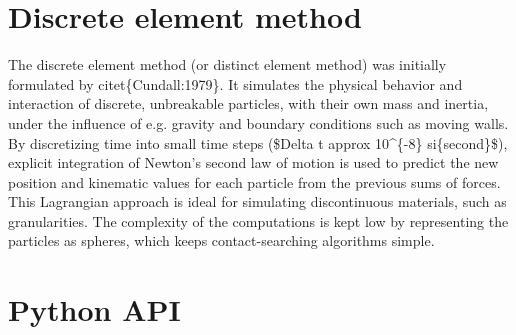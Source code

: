 \documentclass[letterpaper,10pt,english]{sphinxmanual}
\begin{document}
\chapter{Discrete element method}
\label{dem::doc}\label{dem:discrete-element-method}
The discrete element method (or distinct element method) was initially formulated by citet\{Cundall:1979\}. It simulates the physical behavior and interaction of discrete, unbreakable particles, with their own mass and inertia, under the influence of e.g. gravity and boundary conditions such as moving walls. By discretizing time into small time steps (\$Delta t approx 10\textasciicircum{}\{-8\} si\{second\}\$), explicit integration of Newton's second law of motion is used to predict the new position and kinematic values for each particle from the previous sums of forces. This Lagrangian approach is ideal for simulating discontinuous materials, such as granularities. The complexity of the computations is kept low by representing the particles as spheres, which keeps contact-searching algorithms simple.


\chapter{Python API}
\label{python_api:module-sphere}\label{python_api::doc}\label{python_api:python-api}
\end{document}

